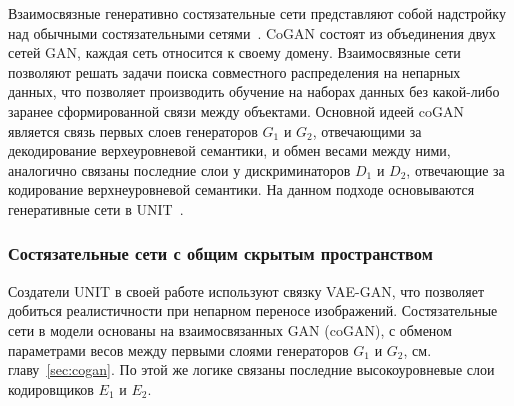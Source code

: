\documentclass[11pt,a4paper]{extarticle}
\begin{document}
			Взаимосвязные генеративно состязательные сети представляют собой надстройку над обычными состязательными сетями~\cite{coGAN}.
			CoGAN состоят из объединения двух сетей GAN, каждая сеть относится к своему домену.
			Взаимосвязные сети позволяют решать задачи поиска совместного распределения на непарных данных,
			что позволяет производить обучение на наборах данных без какой-либо заранее сформированной связи между объектами.
			Основной идеей coGAN является связь первых слоев генераторов \(G_1\) и \(G_2\), отвечающими за декодирование верхеуровневой семантики, и обмен весами между ними,
			аналогично связаны последние слои у дискриминаторов \(D_1\) и \(D_2\), отвечающие за кодирование верхнеуровневой семантики. 
			На данном подходе основываются генеративные сети в UNIT~\cite{UNIT}. 

		\subsubsection{Состязательные сети с общим скрытым пространством}\label{sec:latent}

			Создатели UNIT в своей работе используют связку VAE-GAN, что позволяет добиться реалистичности при непарном переносе изображений.
			Состязательные сети в модели основаны на взаимосвязанных GAN (coGAN), с обменом параметрами весов между первыми слоями генераторов \(G_1\) и \(G_2\), см. главу~\ref{sec:cogan}.
			По этой же логике связаны последние высокоуровневые слои кодировщиков \(E_1\) и \(E_2\). 
			
\end{document}
